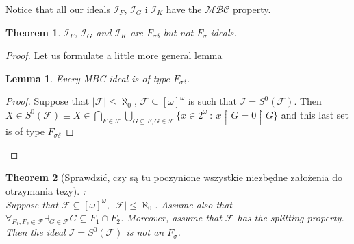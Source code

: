 \documentclass{amsart}
\newtheorem{thm}{Theorem}
\newtheorem{lem}{Lemma}
\theoremstyle{definition}
\theoremstyle{definition}
\newcommand{\N}{{\mathbb N}}
\newcommand{\I}{\mathcal I}
\newcommand{\MB}{S^0}  %
\begin{document}
Notice that all our ideals $\I_F$, $\I_G$ i $\I_K$ have the $\mathcal{MBC}$ property.

%
%
%
%
%
%
%

\begin{thm}
$\I_F$, $\I_G$ and $\I_K$ are $F_{\sigma\delta}$ but not $F_{\sigma}$ ideals.
\end{thm}

\begin{proof}
Let us formulate a little more general lemma
\begin{lem}
Every \emph{MBC} ideal is of type $F_{\sigma\delta}$.
\end{lem}
\begin{proof}
Suppose that $|\mathcal{F}|\leq\aleph_0$, $\mathcal{F}\subseteq [\omega]^\omega$ is such that $\I = \MB(\mathcal{F})$.
Then $X\in \MB(\mathcal{F}) \equiv X\in \bigcap_{F\in\mathcal{F}} \bigcup_{G\subseteq F, G\in\mathcal{F}} \{x\in 2^\omega\ :\ x\upharpoonright G = 0\upharpoonright G\}$ 
and this last set is of type $F_{\sigma\delta}$
\end{proof}
\end{proof}

\begin{thm}
[Sprawdzić, czy są tu poczynione wszystkie niezbędne założenia do otrzymania tezy]:\\
Suppose that $\mathcal{F}\subseteq [\omega]^\omega$,
$|\mathcal{F}|\leq\aleph_0$. 
Assume also that
$\forall_{F_1, F_2 \in \mathcal{F}} \exists_{G \in \mathcal{F}} G \subseteq F_1 \cap F_2$.
Moreover, assume that $\mathcal{F}$ has the splitting property. 
Then the ideal $\I =  \MB(\mathcal{F})$ 
is not an $F_{\sigma}$.
\end{thm}
\end{document}
